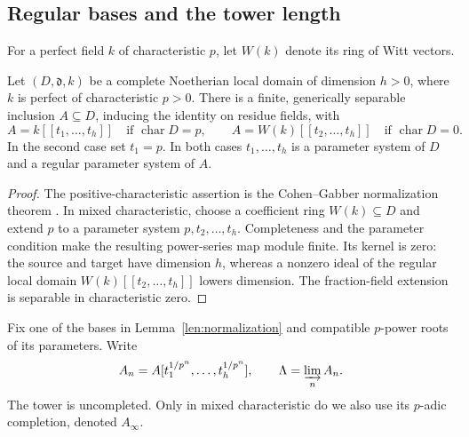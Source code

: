 \subsection{Regular bases and the tower length}

For a perfect field $k$ of characteristic $p$, let $W(k)$ denote its
ring of Witt vectors.

\begin{lemma}\label{len:normalization}
Let $(D,\mathfrak d,k)$ be a complete Noetherian local domain of
dimension $h>0$, where $k$ is perfect of characteristic $p>0$.
There is a finite, generically separable inclusion $A\subseteq D$,
inducing the identity on residue fields, with
\[
 A=k[[t_1,\ldots,t_h]]\quad\text{if }\operatorname{char}D=p,
 \qquad
 A=W(k)[[t_2,\ldots,t_h]]\quad\text{if }\operatorname{char}D=0.
\]
In the second case set $t_1=p$.  In both cases $t_1,\ldots,t_h$
is a parameter system of $D$ and a regular parameter system of $A$.
\end{lemma}

\begin{proof}
The positive-characteristic assertion is the Cohen--Gabber
normalization theorem \cite{CohenGabber}.  In mixed characteristic,
choose a coefficient ring $W(k)\subseteq D$ and extend $p$ to a
parameter system $p,t_2,\ldots,t_h$.  Completeness and the parameter
condition make the resulting power-series map module finite.
Its kernel is zero: the source and target have dimension $h$, whereas
a nonzero ideal of the regular local domain
$W(k)[[t_2,\ldots,t_h]]$ lowers dimension.  The fraction-field
extension is separable in characteristic zero.
\end{proof}

Fix one of the bases in Lemma~\ref{len:normalization} and compatible
$p$-power roots of its parameters.  Write
\begin{equation}\label{len:tower-definition}
 A_n=A[t_1^{1/p^n},\ldots,t_h^{1/p^n}],\qquad
 \Lambda=\varinjlim_n A_n.
\end{equation}
The tower is uncompleted.  Only in mixed characteristic do we also
use its $p$-adic completion, denoted $A_\infty$.

